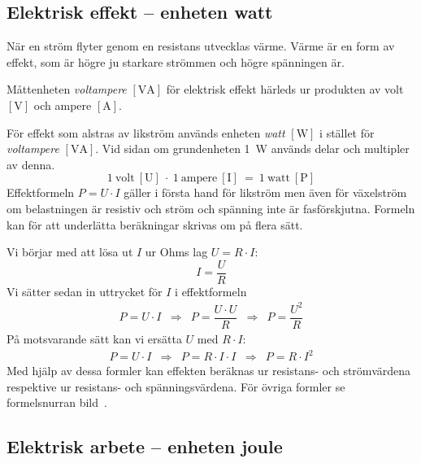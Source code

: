 \subsection{Elektrisk effekt -- enheten watt}
\label{elektrisk_effekt}

När en ström flyter genom en resistans utvecklas värme.
Värme är en form av effekt, som är högre ju starkare strömmen och högre
spänningen är.

Måttenheten \emph{voltampere} \(\mathrm{[VA]}\) för elektrisk effekt härleds ur
produkten av volt \(\mathrm{[V]}\) och ampere \(\mathrm{[A]}\).

För effekt som alstras av likström används enheten \emph{watt} \(\mathrm{[W]}\)
\cite{SIbrochure8} i stället för \emph{voltampere} \(\mathrm{[VA]}\).
Vid sidan om grundenheten \qty{1}{\watt} används delar och multipler av denna.
\[1\ \mathrm{volt\ [U]}\ \cdot\ 1\ \mathrm{ampere\ [I]}\ =\ 1\ \mathrm{watt\ [P]}\]
Effektformeln \(P = U \cdot I\) gäller i första hand för likström men även för
växelström om belastningen är resistiv och ström och spänning inte är
fasförskjutna.
Formeln kan för att underlätta beräkningar skrivas om på flera sätt.

Vi börjar med att lösa ut $I$ ur Ohms lag $U = R \cdot I$:
\[
I = \dfrac{U}{R}
\]
Vi sätter sedan in uttrycket för $I$ i effektformeln
\[
\begin{array}{lllll}
P=U \cdot I & \Rightarrow & P= \dfrac{U \cdot U}{R} & \Rightarrow & P= \dfrac{U^2}{R}
\end{array}
\]
På motsvarande sätt kan vi ersätta $U$ med $R \cdot I$:
\[
\begin{array}{lllll}
P=U \cdot I & \Rightarrow & P = R \cdot I \cdot I  & \Rightarrow & P = R \cdot I^2
\end{array}
\]
Med hjälp av dessa formler kan effekten beräknas ur resistans- och strömvärdena
respektive ur resistans- och spänningsvärdena.
För övriga formler se formelsnurran bild~.

\subsection{Elektrisk arbete -- enheten joule}

